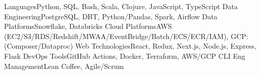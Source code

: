 \begin{additionals}
  \addional
    {Languages}{Python, SQL, Bash, Scala, Clojure, JavaScript, TypeScript}
  \addional
    {Data Engineering}{PostgreSQL, DBT, Python/Pandas, Spark, Airflow}
  \addional
    {Data Platforms}{Snowflake, Databricks}
  \addional
    {Cloud Platforms}{AWS (EC2/S3/RDS/Redshift/MWAA/EventBridge/Batch/ECS/ECR/IAM), GCP: (Composer/Dataproc)}
  \addional
    {Web Technologies}{React, Redux, Next.js, Node.js, Express, Flask}
  \addional
    {DevOps Tools}{GitHub Actions, Docker, Terraform, AWS/GCP CLI}
  \addional
    {Eng Management}{Lean Coffee, Agile/Scrum}
\end{additionals}